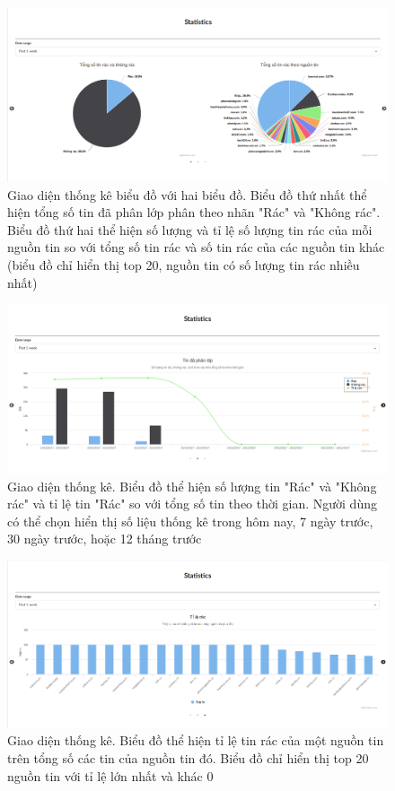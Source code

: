 \begin{figure}[H]
	\centering
	\includegraphics[width=0.96\linewidth]{Chapter3/Chapter3Figs/Chart1.png}
  \caption{Giao diện thống kê biểu đồ với hai biểu đồ. Biểu đồ thứ nhất thể hiện tổng số tin đã phân lớp phân theo nhãn "Rác" và "Không rác". Biểu đồ thứ hai thể hiện số lượng và tỉ lệ số lượng tin rác của mỗi nguồn tin so với tổng số tin rác và số tin rác của các nguồn tin khác (biểu đồ chỉ hiển thị top 20, nguồn tin có số lượng tin rác nhiều nhất)}
	\label{fig:streamingkeywords}
\end{figure}

\begin{figure}[H]
	\centering
	\includegraphics[width=0.96\linewidth]{Chapter3/Chapter3Figs/Chart2.png}
	\caption{Giao diện thống kê. Biểu đồ thể hiện số lượng tin "Rác" và "Không rác" và tỉ lệ tin "Rác" so với tổng số tin theo thời gian. Người dùng có thể chọn hiển thị số liệu thống kê trong hôm nay, 7 ngày trước, 30 ngày trước, hoặc 12 tháng trước }
	\label{fig:streamingkeywords}
\end{figure}

\begin{figure}[H]
	\centering
  \includegraphics[width=0.96\linewidth]{Chapter3/Chapter3Figs/Chart3.png}
  \caption{Giao diện thống kê. Biểu đồ thể hiện tỉ lệ tin rác của một nguồn tin trên tổng số các tin của nguồn tin đó. Biểu đồ chỉ hiển thị top 20 nguồn tin với tỉ lệ lớn nhất và khác 0}
	\label{fig:streamingkeywords}
\end{figure}

